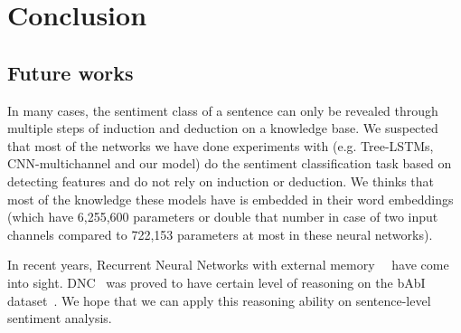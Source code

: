 \section{Conclusion}
\subsection{Future works}
In many cases, the sentiment class of a sentence can only be revealed through multiple steps of induction and deduction on a knowledge base.
We suspected that most of the networks we have done experiments with (e.g. Tree-LSTMs, CNN-multichannel and our model) do the sentiment classification task based on detecting features and do not rely on induction or deduction.
We thinks that most of the knowledge these models have is embedded in their word embeddings (which have 6,255,600 parameters or double that number in case of two input channels compared to 722,153 parameters at most in these neural networks).

In recent years, Recurrent Neural Networks with external memory~\cite{Graves_Nature2016}~\cite{neural-turing-machine} have come into sight.
DNC~\cite{Graves_Nature2016} was proved to have certain level of reasoning on the bAbI dataset~\cite{bAbi}.
We hope that we can apply this reasoning ability on sentence-level sentiment analysis.
